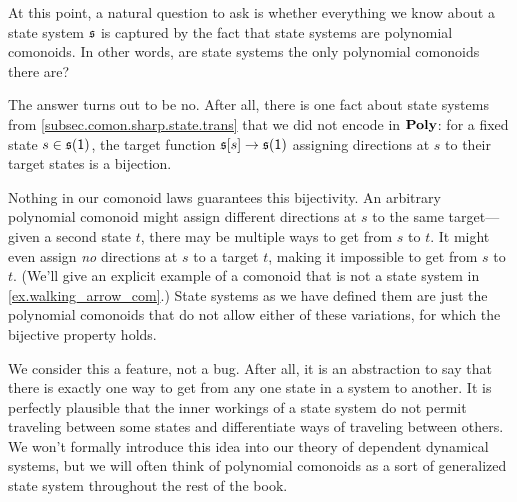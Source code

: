 \documentclass[Book-Poly]{subfiles}
\begin{document}
\begin{example} \label{ex.not_all_com_state}
At this point, a natural question to ask is whether everything we know about a state system $\mathfrak{s}$ is captured by the fact that state systems are polynomial comonoids.
In other words, are state systems the only polynomial comonoids there are?

The answer turns out to be no.
After all, there is one fact about state systems from \cref{subsec.comon.sharp.state.trans} that we did not encode in $\mathbf{Poly}$: for a fixed state $s\in\mathfrak{s}(\textsf{1})$, the target function $\mathfrak{s}[s]\to\mathfrak{s}(\textsf{1})$ assigning directions at $s$ to their target states is a bijection.

Nothing in our comonoid laws guarantees this bijectivity.
An arbitrary polynomial comonoid might assign different directions at $s$ to the same target---given a second state $t$, there may be multiple ways to get from $s$ to $t$.
It might even assign \emph{no} directions at $s$ to a target $t$, making it impossible to get from $s$ to $t$.
(We'll give an explicit example of a comonoid that is not a state system in \cref{ex.walking_arrow_com}.)
State systems as we have defined them are just the polynomial comonoids that do not allow either of these variations, for which the bijective property holds.

We consider this a feature, not a bug.
After all, it is an abstraction to say that there is exactly one way to get from any one state in a system to another.
It is perfectly plausible that the inner workings of a state system do not permit traveling between some states and differentiate ways of traveling between others.
We won't formally introduce this idea into our theory of dependent dynamical systems, %
but we will often think of polynomial comonoids as a sort of generalized state system throughout the rest of the book.
\end{example}
\end{document}
